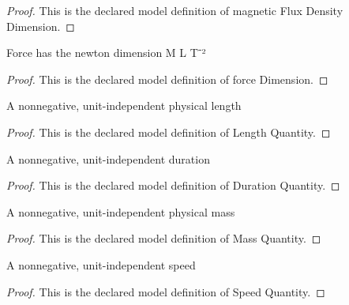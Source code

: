 \begin{proof}
  This is the declared model definition of magnetic Flux Density Dimension.
\end{proof}
\begin{definition}
  \label{def:physics:phyx-mini-0976:phyxminiproblems-problemphyxmini0976-forcedimension}
  Force has the newton dimension M L T⁻²
\end{definition}
\begin{proof}
  This is the declared model definition of force Dimension.
\end{proof}
\begin{definition}
  \label{def:physics:phyx-mini-0976:phyxminiproblems-problemphyxmini0976-lengthquantity}
  A nonnegative, unit-independent physical length
\end{definition}
\begin{proof}
  This is the declared model definition of Length Quantity.
\end{proof}
\begin{definition}
  \label{def:physics:phyx-mini-0976:phyxminiproblems-problemphyxmini0976-durationquantity}
  A nonnegative, unit-independent duration
\end{definition}
\begin{proof}
  This is the declared model definition of Duration Quantity.
\end{proof}
\begin{definition}
  \label{def:physics:phyx-mini-0976:phyxminiproblems-problemphyxmini0976-massquantity}
  A nonnegative, unit-independent physical mass
\end{definition}
\begin{proof}
  This is the declared model definition of Mass Quantity.
\end{proof}
\begin{definition}
  \label{def:physics:phyx-mini-0976:phyxminiproblems-problemphyxmini0976-speedquantity}
  A nonnegative, unit-independent speed
\end{definition}
\begin{proof}
  This is the declared model definition of Speed Quantity.
\end{proof}
